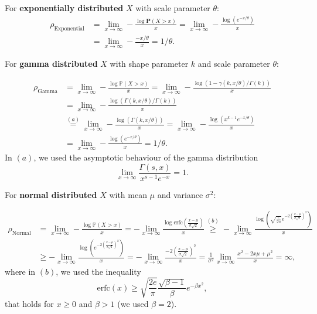 \documentclass{article}
\begin{document}
For \textbf{exponentially distributed} $X$ with scale parameter $\theta$:
\begin{align}
  \rho_{\text{Exponential}} &=\lim_{x \rightarrow \infty} -\frac{\log\textbf{P}(X > x)}{x}  = \lim_{x \rightarrow \infty} -\frac{\log(e^{- x/\theta})}{x}   \nonumber \\
  &=\lim_{x \rightarrow \infty} -\frac{-x/\theta }{x } = 1/\theta. \tag{2}
\end{align}

For \textbf{gamma distributed} $X$ with shape parameter $k$ and scale parameter $\theta$:

\begin{align}
  \rho_{\text{Gamma}} &= \lim_{x\rightarrow \infty} -\frac{\log \mathbb{P}(X>x)}{x} = \lim_{x\rightarrow \infty} -\frac{\log (1-\gamma(k,x/\theta)/\Gamma(k))}{x} \nonumber  \\
  &=\lim_{x\rightarrow \infty} -\frac{\log (\Gamma(k,x/\theta)/\Gamma(k))}{x} \nonumber \\
  &\overset{(a)}{=} \lim_{x\rightarrow \infty} -\frac{\log (\Gamma(k,x/\theta))}{x} = \lim_{x\rightarrow \infty} -\frac{\log\left(x^{k-1}e^{-x/\theta}\right) }{x}\label{line:22} \nonumber \\
  &= \lim_{x\rightarrow \infty} -\frac{\log \left(e^{-x/\theta}\right)}{x} = 1/\theta. \tag{3}
\end{align}
In $(a)$, we used the asymptotic behaviour of the gamma distribution
$$
\lim_{x \rightarrow \infty}\frac{\Gamma(s,x)}{x^{s-1}e^{-x}} = 1.
$$

For \textbf{normal distributed} $X$ with mean $\mu$ and variance $\sigma^2$:

\begin{align}
  \rho_{\text{Normal}} &= \lim_{x\rightarrow \infty} -\frac{\log \mathbb{P}(X>x)}{x} = -\lim_{x\rightarrow \infty} \frac{\log \text{erfc}\left(\frac{x-\mu}{\sigma \sqrt{2}}\right)}{x} \overset{(b)}{\geq} -\lim_{x\rightarrow \infty} \frac{\log\left( \sqrt{\frac{e}{2\pi}}e^{-2\left(\frac{x-\mu}{\sigma \sqrt{2}}\right)^2} \right)}{x} \nonumber \\
  &\geq -\lim_{x\rightarrow \infty} \frac{\log\left( e^{-2\left(\frac{x-\mu}{\sigma \sqrt{2}}\right)^2} \right)}{x} = -\lim_{x\rightarrow \infty} \frac{-2\left(\frac{x-\mu}{\sigma \sqrt{2}}\right)^2} {x} = \frac{1}{\sigma^2 }\lim_{x\rightarrow \infty} \frac{x^2-2 x \mu + \mu^2}{ x}  = \infty, \tag{4}
\end{align}
where in $(b)$, we used the inequality $$\text{erfc}(x) \geq \sqrt{\frac{{2 e}}{\pi}} \frac{\sqrt{\beta-1}}{\beta} e^{-\beta x^2},$$ that holds for $x \geq 0$ and $\beta >1$ (we used $\beta = 2$).
\end{document}
